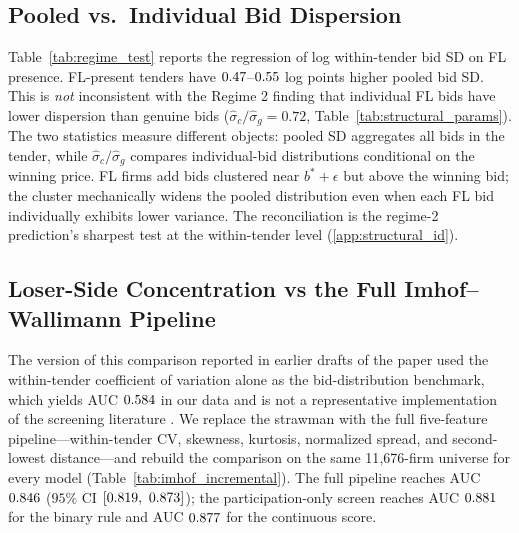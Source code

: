 \begin{table}[htbp]
\centering
\caption{Price Coefficient Across IQR Multiplier Thresholds}
\label{tab:threshold}

\end{table}

\subsection{Pooled vs.\ Individual Bid Dispersion}

Table~\ref{tab:regime_test} reports the regression of log
within-tender bid SD on FL presence. FL-present tenders have
$0.47$--$0.55$ log points higher pooled bid SD. This is
\emph{not} inconsistent with the Regime 2 finding that
individual FL bids have lower dispersion than genuine bids
($\hat{\sigma}_c / \hat{\sigma}_g = 0.72$,
Table~\ref{tab:structural_params}). The two statistics
measure different objects: pooled SD aggregates all bids in
the tender, while $\hat{\sigma}_c / \hat{\sigma}_g$ compares
individual-bid distributions conditional on the winning price.
FL firms add bids clustered near $b^* + \epsilon$ but above
the winning bid; the cluster mechanically widens the pooled
distribution even when each FL bid individually exhibits lower
variance. The reconciliation is the regime-2 prediction's
sharpest test at the within-tender level (\ref{app:structural_id}).



\subsection{Loser-Side Concentration vs the Full Imhof--Wallimann Pipeline}

The version of this comparison reported in earlier drafts of the
paper used the within-tender coefficient of variation alone as
the bid-distribution benchmark, which yields AUC $0.584$ in our
data and is not a representative implementation of the screening
literature \citep{imhof2019detecting, huber2019machine,
wallimann2023machine}. We replace the strawman with the full
five-feature pipeline---within-tender CV, skewness, kurtosis,
normalized spread, and second-lowest distance---and rebuild the
comparison on the same 11{,}676-firm universe for every model
(Table~\ref{tab:imhof_incremental}). The full pipeline reaches
AUC $0.846$ ($95\%$ CI $[0.819,\ 0.873]$); the
participation-only screen reaches AUC $0.881$ for the
binary rule and AUC $0.877$ for the continuous score.

